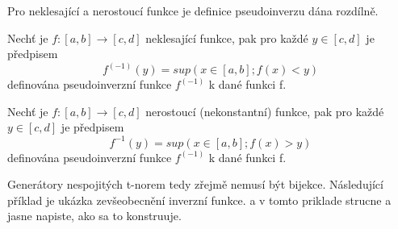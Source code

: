     Pro neklesající a nerostoucí funkce je definice pseudoinverzu dána rozdílně.
\begin{definition}
    \cite{hlinena}
    Nech\v t je $f:[a,b] \rightarrow [c,d]$ neklesající funkce, pak pro každé $y \in [c,d]$ je předpisem $$f^{(-1)}(y) = sup(x \in [a,b];f(x)<y)$$
    definována pseudoinverzní funkce $f^{(-1)}$ k dané funkci f.
\end{definition}
\begin{definition}
    \cite{hlinena}
    Nech\v t je $f:[a,b] \rightarrow [c,d]$ nerostoucí (nekonstantní) funkce, pak pro každé $y \in [c,d]$ je předpisem $$f^{-1}(y) = sup(x \in [a,b];f(x)>y)$$
    definována pseudoinverzní funkce $f^{(-1)}$ k dané funkci f.
\end{definition}

Generátory nespojitých t-norem tedy zřejmě nemusí být bijekce. Následující příklad je ukázka zevšeobecnění inverzní funkce. {\color{red} a v tomto priklade strucne a jasne napiste, ako sa to konstruuje.}
